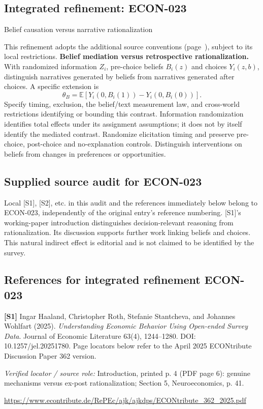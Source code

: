 \documentclass[11pt,a4paper]{article}
\begin{document}
\subsection*{Integrated refinement: ECON-023}
{\sffamily\small\color{muted}Belief causation versus narrative rationalization\par}
This refinement adopts the additional source conventions
(page~\pageref{audited:conventions}), subject to its local restrictions.
\textbf{Belief mediation versus retrospective rationalization.}
With randomized information $Z_i$, pre-choice beliefs $B_i(z)$ and choices
$Y_i(z,b)$, distinguish narratives generated by beliefs from narratives generated
after choices. A specific extension is
\[
\theta_B=\mathbb E[Y_i(0,B_i(1))-Y_i(0,B_i(0))].
\]
Specify timing, exclusion, the belief/text measurement law, and cross-world
restrictions identifying or bounding this contrast. Information randomization
identifies total effects under its assignment assumptions; it does not by itself
identify the mediated contrast. Randomize elicitation timing and preserve
pre-choice, post-choice and no-explanation controls. Distinguish interventions on
beliefs from changes in preferences or opportunities.
\subsection*{Supplied source audit for ECON-023}
Local [S1], [S2], etc. in this audit and the references immediately below
belong to ECON-023, independently of the original entry's reference numbering.
[S1]'s working-paper introduction distinguishes decision-relevant reasoning from rationalization. Its discussion supports further work linking beliefs and choices. This natural indirect effect is editorial and is not claimed to be identified by the survey.
\subsection*{References for integrated refinement ECON-023}
{\footnotesize\raggedright
\par\noindent\textbf{[S1]} Ingar Haaland, Christopher Roth, Stefanie Stantcheva, and Johannes Wohlfart (2025). \emph{Understanding Economic Behavior Using Open-ended Survey Data}. Journal of Economic Literature 63(4), 1244–1280. DOI: 10.1257/jel.20251780. Page locators below refer to the April 2025 ECONtribute Discussion Paper 362 version.\par \textit{Verified locator / source role:} Introduction, printed p. 4 (PDF page 6): genuine mechanisms versus ex-post rationalization; Section 5, Neuroeconomics, p. 41.\par \url{https://www.econtribute.de/RePEc/ajk/ajkdps/ECONtribute_362_2025.pdf}\par\smallskip
}
\end{document}
